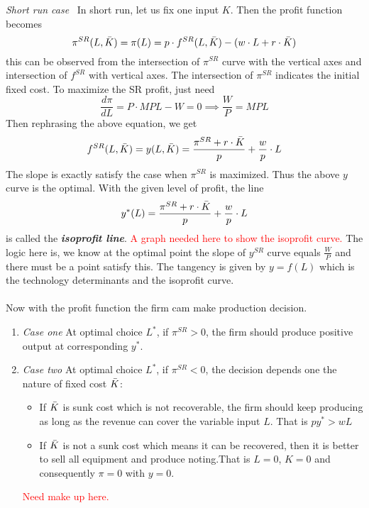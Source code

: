 \documentclass[10pt]{article}
\newenvironment{changemargin}[2]{%
  \begin{list}{}{%
    \setlength{\topsep}{0pt}%
    \setlength{\leftmargin}{#1}%
    \setlength{\rightmargin}{#2}%
    \setlength{\listparindent}{\parindent}%
    \setlength{\itemindent}{\parindent}%
    \setlength{\parsep}{\parskip}%
  }%
  \item[]}{\end{list}}
\begin{document}
\begin{changemargin}{-0.125in}{0in}
\begin{enumerate}
\begin{enumerate}
        \textit{Short run case}\,\,\, In short run, let us fix one input $K$. Then the profit function becomes
        \[
        \pi^{SR}(L,\Bar{K}) = \pi(L) = p\cdot f^{SR}(L,\Bar{K}) - (w\cdot L + r\cdot \Bar{K})
        \]
        this can be observed from the intersection of $\pi^{SR}$ curve with the vertical axes and intersection of $f^{SR}$ with vertical axes. The intersection of $\pi^{SR}$ indicates the initial fixed cost. To maximize the SR profit, just need
        \[
        \frac{d\pi}{dL} = P \cdot MPL -W = 0 \implies \frac{W}{P} = MPL
        \]
        Then rephrasing the above equation, we get 
        \[
        f^{SR}(L,\Bar{K})= y(L,\Bar{K}) =\frac{\pi^{SR}+r\cdot\Bar{K}}{p}+ \frac{w}{p}\cdot L
        \]
        The slope is exactly satisfy the case when $\pi^{SR}$ is maximized. Thus the above $y$ curve is the optimal. With the given level of profit, the line 
        \[
        y^*(L)= \frac{\pi^{SR}+r\cdot\Bar{K}}{p}+ \frac{w}{p}\cdot L
        \]
        is called the \textbf{\textit{isoprofit line}}. \textcolor{red}{A graph needed here to show the isoprofit curve.} The logic here is, we know at the optimal point the slope of $y^{SR}$ curve equals $\frac{W}{P}$ and there must be a point satisfy this. The tangency is given by $y=f(L)$ which is the technology determinants and the isoprofit curve.
        \\
        \\
        Now with the profit function the firm cam make production decision.
        \begin{enumerate}
            \item \textit{Case one}\;\;\; At optimal choice $L^*$, if  $\pi^{SR} > 0$, the firm should produce positive output at corresponding $y^*$.
            \\
            \item \textit{Case two}\;\;\; At optimal choice $L^*$, if  $\pi^{SR} < 0$, the decision depends one the nature of fixed cost $\Bar{K}$: 
         
         \smallskip
         
            \begin{itemize}
                \item If $\Bar{K}$ is sunk cost which is not recoverable, the firm should keep producing as long as the revenue can cover the variable input $L$. That is $py^* > wL$ 
                
                \smallskip
                
                \item  If $\Bar{K}$ is not a sunk cost which means it can be recovered, then it is better to sell all equipment and produce noting.That is $L = 0$, $K = 0$ and consequently $\pi = 0$ with $y= 0$.
            \end{itemize}
            \textcolor{red}{Need make up here.}
        \end{enumerate}
        

\end{enumerate}
\end{enumerate}
\end{changemargin}
\end{document}
